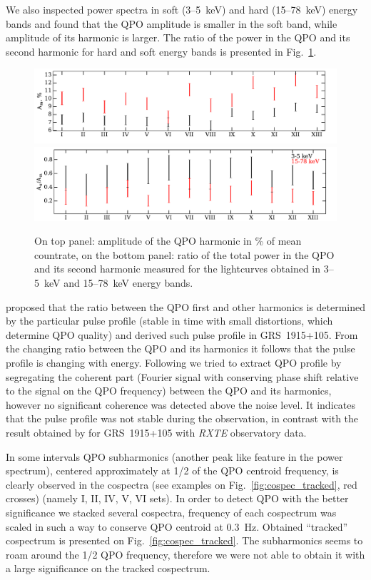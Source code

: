 \documentclass[a4paper,fleqn,usenatbib]{mnras}
\begin{document}
We also inspected power spectra in soft (3--5~keV) and hard (15--78~keV) energy bands and found that the QPO amplitude is smaller in the soft band, while amplitude of its harmonic is larger.
The ratio of the power in the QPO and its second harmonic for hard and soft energy bands is presented in Fig.~\ref{fig:qpo_ratio}.
\begin{figure}
\includegraphics[width=\columnwidth]{Q_ampl2.pdf}
\includegraphics[width=\columnwidth]{QPO_and_harmonic_ratio_ylabel.pdf}
        \caption{On top panel: amplitude of the QPO harmonic in \% of mean countrate, on the bottom panel: ratio of the total power in the QPO and its second harmonic measured for the lightcurves obtained in 3--5~keV and 15--78~keV energy bands.}
        \label{fig:qpo_ratio}
\end{figure}
\citet{2015MNRAS.446.3516I} proposed that the ratio between the QPO first and other harmonics is determined by the particular pulse profile (stable in time with small distortions, which determine QPO quality) and derived such pulse profile in GRS~1915+105.
From the changing ratio between the QPO and its harmonics it follows that the pulse profile is changing with energy. 
Following \citet{2015MNRAS.446.3516I} we tried to extract QPO profile by segregating the coherent part (Fourier signal with conserving phase shift relative to the signal on the QPO frequency) between the QPO and its harmonics, however no significant coherence was detected above the noise level.
It indicates that the pulse profile was not stable during the observation, in contrast with the result obtained by \citet{2015MNRAS.446.3516I} for GRS~1915+105 with {\it RXTE} observatory data.

In some intervals QPO subharmonics (another peak like feature in the power spectrum), centered approximately at 1/2 of the QPO centroid frequency, is clearly observed in the cospectra (see examples on Fig.~\ref{fig:cospec_tracked}, red crosses) (namely I, II, IV, V, VI sets).
In order to detect QPO with the better significance we stacked several cospectra, frequency of each cospectrum was scaled in such a way to conserve QPO centroid at 0.3~Hz.
Obtained ``tracked'' cospectrum is presented on Fig.~\ref{fig:cospec_tracked}.
The subharmonics seems to roam around the 1/2 QPO frequency, therefore we were not able to obtain it with a large significance on the tracked cospectrum.
\end{document}
